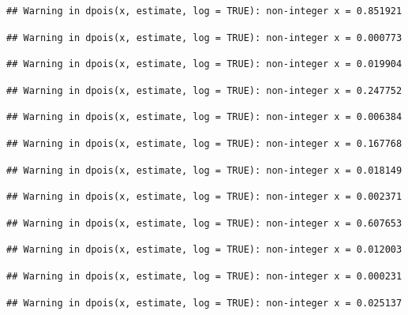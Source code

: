 \documentclass[]{article}
\begin{document}
\begin{verbatim}
## Warning in dpois(x, estimate, log = TRUE): non-integer x = 0.851921
\end{verbatim}

\begin{verbatim}
## Warning in dpois(x, estimate, log = TRUE): non-integer x = 0.000773
\end{verbatim}

\begin{verbatim}
## Warning in dpois(x, estimate, log = TRUE): non-integer x = 0.019904
\end{verbatim}

\begin{verbatim}
## Warning in dpois(x, estimate, log = TRUE): non-integer x = 0.247752
\end{verbatim}

\begin{verbatim}
## Warning in dpois(x, estimate, log = TRUE): non-integer x = 0.006384
\end{verbatim}

\begin{verbatim}
## Warning in dpois(x, estimate, log = TRUE): non-integer x = 0.167768
\end{verbatim}

\begin{verbatim}
## Warning in dpois(x, estimate, log = TRUE): non-integer x = 0.018149
\end{verbatim}

\begin{verbatim}
## Warning in dpois(x, estimate, log = TRUE): non-integer x = 0.002371
\end{verbatim}

\begin{verbatim}
## Warning in dpois(x, estimate, log = TRUE): non-integer x = 0.607653
\end{verbatim}

\begin{verbatim}
## Warning in dpois(x, estimate, log = TRUE): non-integer x = 0.012003
\end{verbatim}

\begin{verbatim}
## Warning in dpois(x, estimate, log = TRUE): non-integer x = 0.000231
\end{verbatim}

\begin{verbatim}
## Warning in dpois(x, estimate, log = TRUE): non-integer x = 0.025137
\end{verbatim}
\end{document}
